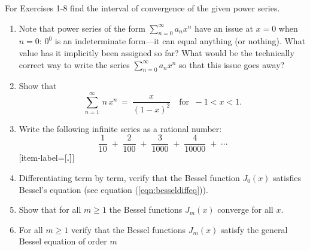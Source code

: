 {\small
{}
\par\noindent For Exercises 1-8 find the interval of convergence of the given
power series.
\begin{enumerate}[item-label={\bfseries \arabic*.}]
 \item Note that power series of the form $\sum_{n=0}^{\infty} a_n x^n$ have an
  issue at $x=0$ when $n=0$: $0^0$ is an indeterminate form---it can equal
  anything (or nothing). What value has it implicitly been assigned so far?
  What would be the technically correct way to write the series
  $\sum_{n=0}^{\infty} a_n x^n$ so that this issue goes away?
 \item Show that
\[
\sum_{n=1}^{\infty}\,n\,x^n ~=~ \frac{x}{(1-x)^2} \quad\text{for $~-1<x<1$.}
\]
 \item Write the following infinite series as a rational number:
\[
\frac{1}{10} \;+\; \frac{2}{100} \;+\; \frac{3}{1000} \;+\; \frac{4}{10000}
\;+\; \cdots
\]
[item-label={{[\bfseries \arabic*.]}}]
 \item Differentiating term by term, verify that the Bessel function $J_0(x)$
  satisfies Bessel's equation (see equation (\ref{eqn:besseldiffeq})).
 \item Show that for all $m \ge 1$ the Bessel functions $J_m(x)$ converge for
  all $x$.
 \item For all $m \ge 1$ verify that the Bessel functions $J_m(x)$ satisfy the
  general Bessel equation of order $m$

\end{enumerate}}
